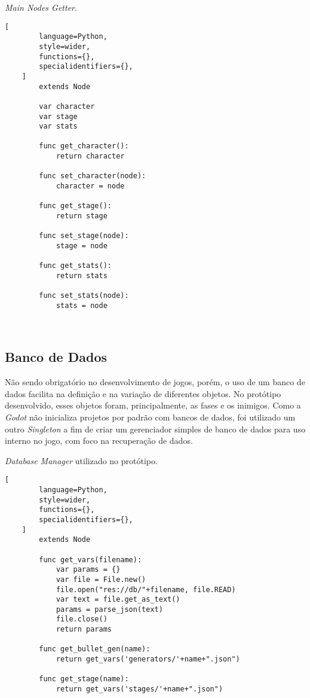 \begin{programruledcaption}{\textit{Main Nodes Getter}.\label{prog:main_nodes_getter}}
    \begin{lstlisting}[
        language=Python,
        style=wider,
        functions={},
        specialidentifiers={},
    ]
        extends Node

        var character
        var stage
        var stats
        
        func get_character():
            return character
        
        func set_character(node):
            character = node
        
        func get_stage():
            return stage
        
        func set_stage(node):
            stage = node
        
        func get_stats():
            return stats
        
        func set_stats(node):
            stats = node
        
    
    \end{lstlisting}
\end{programruledcaption}

\subsection{Banco de Dados}\label{BancoDeDados}

Não sendo obrigatório no desenvolvimento de jogos, porém, o uso de um banco de dados facilita na definição e na variação de diferentes objetos. No protótipo desenvolvido, esses objetos foram, principalmente, as fases e os inimigos. Como a \textit{Godot} não inicializa projetos por padrão com bancos de dados, foi utilizado um outro \textit{Singleton} a fim de criar um gerenciador simples de banco de dados para uso interno no jogo, com foco na recuperação de dados.

\pagebreak

\begin{programruledcaption}{\textit{Database Manager} utilizado no protótipo.\label{prog:db_manager}}
    \begin{lstlisting}[
        language=Python,
        style=wider,
        functions={},
        specialidentifiers={},
    ]
        extends Node

        func get_vars(filename):
            var params = {}
            var file = File.new()
            file.open("res://db/"+filename, file.READ)
            var text = file.get_as_text()
            params = parse_json(text)
            file.close()
            return params
        
        func get_bullet_gen(name):
            return get_vars('generators/'+name+".json")
        
        func get_stage(name):
            return get_vars('stages/'+name+".json")
        
    
    \end{lstlisting}
\end{programruledcaption}

